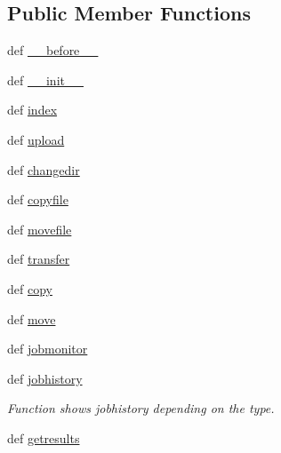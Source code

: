 \subsection*{\-Public \-Member \-Functions}
\begin{DoxyCompactItemize}
\item 
def \hyperlink{classcyberweb_1_1controllers_1_1data_1_1_data_controller_a45338be50362ce9b8075797a05a990dc}{\-\_\-\-\_\-before\-\_\-\-\_\-}
\item 
def \hyperlink{classcyberweb_1_1controllers_1_1data_1_1_data_controller_a89d6ea4fa58811b6a6d3ac0beedcf29f}{\-\_\-\-\_\-init\-\_\-\-\_\-}
\item 
def \hyperlink{classcyberweb_1_1controllers_1_1data_1_1_data_controller_accca19c1311d93bb44e6c433b5233c89}{index}
\item 
def \hyperlink{classcyberweb_1_1controllers_1_1data_1_1_data_controller_ac86ab78efce554788df7cb9aac9c52b4}{upload}
\item 
def \hyperlink{classcyberweb_1_1controllers_1_1data_1_1_data_controller_a94eee385c9d22a1040c2d4db5fe3ce43}{changedir}
\item 
def \hyperlink{classcyberweb_1_1controllers_1_1data_1_1_data_controller_ae60809db6b7ec1e6edd2b60e98cda9c7}{copyfile}
\item 
def \hyperlink{classcyberweb_1_1controllers_1_1data_1_1_data_controller_ac57caf8d869f39a61edaa42444e9ecdc}{movefile}
\item 
def \hyperlink{classcyberweb_1_1controllers_1_1data_1_1_data_controller_afe3a0f7824956f2a3d0498459c2f74b8}{transfer}
\item 
def \hyperlink{classcyberweb_1_1controllers_1_1data_1_1_data_controller_ac159f80e184265a7c4c7b12b0b550da4}{copy}
\item 
def \hyperlink{classcyberweb_1_1controllers_1_1data_1_1_data_controller_a2d78b0e7d1528f0db7fceae10ce3abb9}{move}
\item 
def \hyperlink{classcyberweb_1_1controllers_1_1data_1_1_data_controller_a47e6f70fe6d1779f9be498777627baf1}{jobmonitor}
\item 
def \hyperlink{classcyberweb_1_1controllers_1_1data_1_1_data_controller_ac6fc3642d98d8f07054940a1329edabb}{jobhistory}
\begin{DoxyCompactList}\small\item\em \-Function shows jobhistory depending on the type. \end{DoxyCompactList}\item 
def \hyperlink{classcyberweb_1_1controllers_1_1data_1_1_data_controller_aeecd0444bdccaa862034a361ac11ad3b}{getresults}

\end{DoxyCompactItemize}
